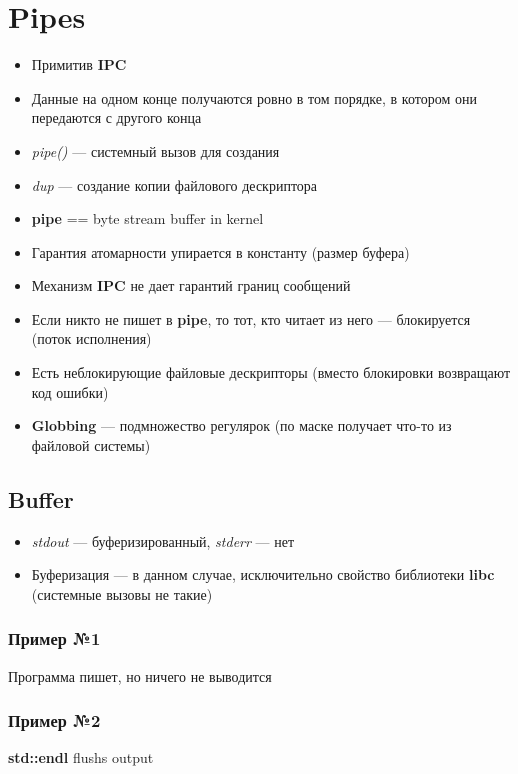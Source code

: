 \documentclass[../../lectures.tex]{subfiles}
\begin{document}
\newpage
\section{Pipes}
\begin{itemize}
    \item Примитив \textbf{IPC}
    \item Данные на одном конце получаются ровно в том порядке, в котором они передаются с другого конца
    \item \emph{pipe()} --- системный вызов для создания\\
    \item \emph{dup} --- создание копии файлового дескриптора\\
    \item \textbf{pipe} == byte stream buffer in kernel
    \item Гарантия атомарности упирается в константу (размер буфера)
    \item Механизм \textbf{IPC} не дает гарантий границ сообщений
    \item Если никто не пишет в \textbf{pipe}, то тот, кто читает из него --- блокируется (поток исполнения)

    \item Есть неблокирующие файловые дескрипторы (вместо блокировки возвращают код ошибки)
    \item \textbf{Globbing} --- подмножество регулярок (по маске получает что-то из файловой системы)
\end{itemize}

\subsection{Buffer}
\begin{itemize}
    \item \emph{stdout} --- буферизированный, \emph{stderr} --- нет
    \item Буферизация --- в данном случае, исключительно свойство библиотеки \textbf{libc} (системные вызовы не такие)
\end{itemize}

\subsubsection{Пример №1}
Программа пишет, но ничего не выводится

\subsubsection{Пример №2}
\textbf{std::endl} flushs output
\end{document}
